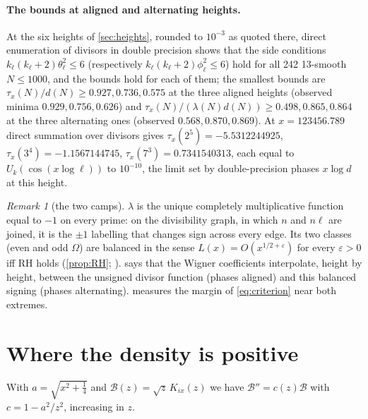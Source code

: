 \documentclass[11pt]{article}
\theoremstyle{definition}\newtheorem{definition}[theorem]{Definition}
\theoremstyle{remark}\newtheorem{remark}[theorem]{Remark}
\begin{document}
\paragraph{The bounds at aligned and alternating heights.} At the six heights of \cref{sec:heights}, rounded to $10^{-3}$ as quoted there, direct enumeration of divisors in double precision shows that the side conditions $k_\ell(k_\ell+2)\theta_\ell^2\le6$ (respectively $k_\ell(k_\ell+2)\phi_\ell^2\le6$) hold for all 242 13-smooth $N\le1000$, and the bounds hold for each of them; the smallest bounds are $\tau_x(N)/d(N)\ge0.927,0.736,0.575$ at the three aligned heights (observed minima $0.929,0.756,0.626$) and $\tau_x(N)/(\lambda(N)d(N))\ge0.498,0.865,0.864$ at the three alternating ones (observed $0.568,0.870,0.869$). At $x=123456.789$ direct summation over divisors gives $\tau_x(2^5)=-5.5312244925$, $\tau_x(3^4)=-1.1567144745$, $\tau_x(7^3)=0.7341540313$, each equal to $U_k(\cos(x\log\ell))$ to $10^{-10}$, the limit set by double-precision phases $x\log d$ at this height.

\begin{remark}[the two camps]\label{rem:camps}
$\lambda$ is the unique completely multiplicative function equal to $-1$ on every prime: on the divisibility graph, in which $n$ and $n\ell$ are joined, it is the $\pm1$ labelling that changes sign across every edge. Its two classes (even and odd $\Omega$) are balanced in the sense $L(x)=O(x^{1/2+\varepsilon})$ for every $\varepsilon>0$ iff RH holds (\cref{prop:RH}; \cite[Thm.~1.2]{Borwein}).  says that the Wigner coefficients interpolate, height by height, between the unsigned divisor function (phases aligned) and this balanced signing (phases alternating).  measures the margin of \eqref{eq:criterion} near both extremes.
\end{remark}

\section{Where the density is positive}\label{sec:positive}

With $a=\sqrt{x^2+\frac14}$ and $\mathcal B(z)=\sqrt z\,K_{ix}(z)$ we have $\mathcal B''=c(z)\mathcal B$ with $c=1-a^2/z^2$, increasing in $z$.
\end{document}
